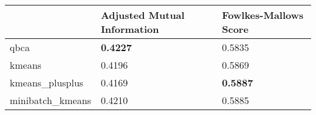 \begin{table}[htbp]
\centering
\begin{tabular}{lll}
\toprule
 & Adjusted Mutual Information & Fowlkes-Mallows Score \\
\midrule
qbca & \textbf{0.4227} & 0.5835 \\
kmeans & 0.4196 & 0.5869 \\
kmeans_plusplus & 0.4169 & \textbf{0.5887} \\
minibatch_kmeans & 0.4210 & 0.5885 \\
\bottomrule
\end{tabular}
\end{table}
